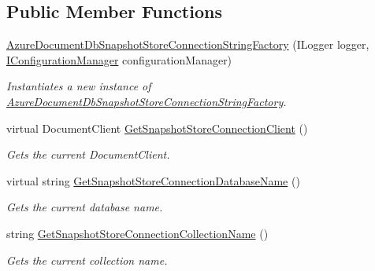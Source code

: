 \subsection*{Public Member Functions}
\begin{DoxyCompactItemize}
\item 
\hyperlink{classCqrs_1_1Azure_1_1DocumentDb_1_1Events_1_1AzureDocumentDbSnapshotStoreConnectionStringFactory_ad13780f58118068bfaf0edae26cf766b_ad13780f58118068bfaf0edae26cf766b}{Azure\+Document\+Db\+Snapshot\+Store\+Connection\+String\+Factory} (I\+Logger logger, \hyperlink{interfaceCqrs_1_1Configuration_1_1IConfigurationManager}{I\+Configuration\+Manager} configuration\+Manager)
\begin{DoxyCompactList}\small\item\em Instantiates a new instance of \hyperlink{classCqrs_1_1Azure_1_1DocumentDb_1_1Events_1_1AzureDocumentDbSnapshotStoreConnectionStringFactory}{Azure\+Document\+Db\+Snapshot\+Store\+Connection\+String\+Factory}. \end{DoxyCompactList}\item 
virtual Document\+Client \hyperlink{classCqrs_1_1Azure_1_1DocumentDb_1_1Events_1_1AzureDocumentDbSnapshotStoreConnectionStringFactory_a7dfd66f2b187f61b2581e72be408a15d_a7dfd66f2b187f61b2581e72be408a15d}{Get\+Snapshot\+Store\+Connection\+Client} ()
\begin{DoxyCompactList}\small\item\em Gets the current Document\+Client. \end{DoxyCompactList}\item 
virtual string \hyperlink{classCqrs_1_1Azure_1_1DocumentDb_1_1Events_1_1AzureDocumentDbSnapshotStoreConnectionStringFactory_a7e27bfdf697514310a63cc673aa8d800_a7e27bfdf697514310a63cc673aa8d800}{Get\+Snapshot\+Store\+Connection\+Database\+Name} ()
\begin{DoxyCompactList}\small\item\em Gets the current database name. \end{DoxyCompactList}\item 
string \hyperlink{classCqrs_1_1Azure_1_1DocumentDb_1_1Events_1_1AzureDocumentDbSnapshotStoreConnectionStringFactory_a8b825aff585bc2ce4b5f24dd03548e8b_a8b825aff585bc2ce4b5f24dd03548e8b}{Get\+Snapshot\+Store\+Connection\+Collection\+Name} ()
\begin{DoxyCompactList}\small\item\em Gets the current collection name. \end{DoxyCompactList}\end{DoxyCompactItemize}
